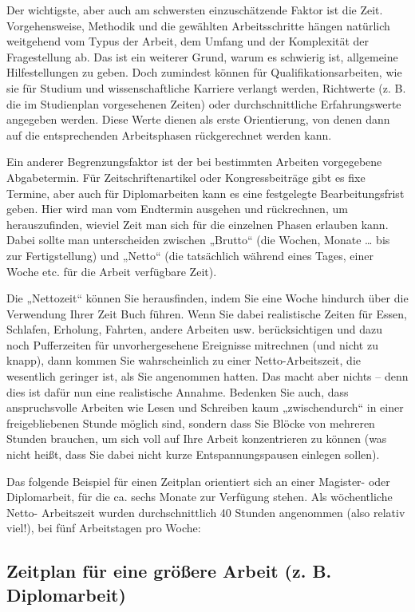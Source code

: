 \documentclass[]{book}
\theoremstyle{definition}
\theoremstyle{definition}
\theoremstyle{definition}
\theoremstyle{remark}
\begin{document}
Der wichtigste, aber auch am schwersten einzuschätzende Faktor ist die
Zeit. Vorgehensweise, Methodik und die gewählten Arbeitsschritte hängen
natürlich weitgehend vom Typus der Arbeit, dem Umfang und der
Komplexität der Fragestellung ab. Das ist ein weiterer Grund, warum es
schwierig ist, allgemeine Hilfestellungen zu geben. Doch zumindest
können für Qualifikationsarbeiten, wie sie für Studium und
wissenschaftliche Karriere verlangt werden, Richtwerte (z. B. die im
Studienplan vorgesehenen Zeiten) oder durchschnittliche Erfahrungswerte
angegeben werden. Diese Werte dienen als erste Orientierung, von denen
dann auf die entsprechenden Arbeitsphasen rückgerechnet werden kann.

Ein anderer Begrenzungsfaktor ist der bei bestimmten Arbeiten
vorgegebene Abgabetermin. Für Zeitschriftenartikel oder Kongressbeiträge
gibt es fixe Termine, aber auch für Diplomarbeiten kann es eine
festgelegte Bearbeitungsfrist geben. Hier wird man vom Endtermin
ausgehen und rückrechnen, um herauszufinden, wieviel Zeit man sich für
die einzelnen Phasen erlauben kann. Dabei sollte man unterscheiden
zwischen „Brutto`` (die Wochen, Monate \ldots{} bis zur Fertigstellung)
und „Netto`` (die tatsächlich während eines Tages, einer Woche etc. für
die Arbeit verfügbare Zeit).

Die „Nettozeit`` können Sie herausfinden, indem Sie eine Woche hindurch
über die Verwendung Ihrer Zeit Buch führen. Wenn Sie dabei realistische
Zeiten für Essen, Schlafen, Erholung, Fahrten, andere Arbeiten usw.
berücksichtigen und dazu noch Pufferzeiten für unvorhergesehene
Ereignisse mitrechnen (und nicht zu knapp), dann kommen Sie
wahrscheinlich zu einer Netto-Arbeitszeit, die wesentlich geringer ist,
als Sie angenommen hatten. Das macht aber nichts -- denn dies ist dafür
nun eine realistische Annahme. Bedenken Sie auch, dass anspruchsvolle
Arbeiten wie Lesen und Schreiben kaum „zwischendurch`` in einer
freigebliebenen Stunde möglich sind, sondern dass Sie Blöcke von
mehreren Stunden brauchen, um sich voll auf Ihre Arbeit konzentrieren zu
können (was nicht heißt, dass Sie dabei nicht kurze Entspannungspausen
einlegen sollen).

Das folgende Beispiel für einen Zeitplan orientiert sich an einer
Magister- oder Diplomarbeit, für die ca. sechs Monate zur Verfügung
stehen. Als wöchentliche Netto- Arbeitszeit wurden durchschnittlich 40
Stunden angenommen (also relativ viel!), bei fünf Arbeitstagen pro
Woche:

\subsection{Zeitplan für eine größere Arbeit (z. B.
Diplomarbeit)}\label{zeitplan-fur-eine-groere-arbeit-z.-b.-diplomarbeit}
\end{document}
